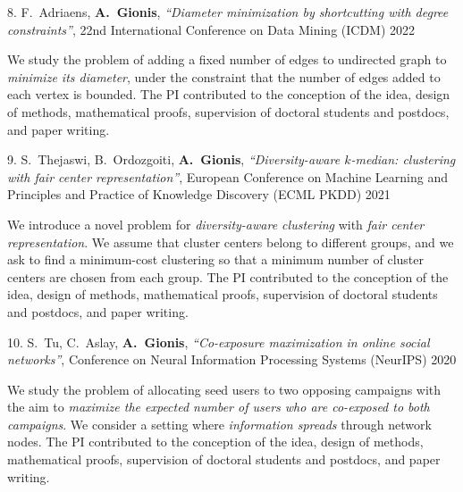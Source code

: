 \documentclass[a4paper,11pt]{article}
\begin{document}
\item[{8.}]
{F.\ Adriaens, \textbf{A.\ Gionis}},
{\em ``Diameter minimization by shortcutting with degree constraints''},
22nd International Conference on Data Mining (ICDM) 2022
%
\item[]
We study the problem of adding a fixed number
of edges to undirected graph to \emph{minimize its diameter}, 
under the constraint that the number of edges added to each vertex is bounded.
The PI contributed to the conception of the idea, 
design of methods, mathematical proofs, supervision of doctoral students and postdocs, and paper writing.

\textbibspace

\item[{9.}]
{S.\ Thejaswi, B.\ Ordozgoiti, \textbf{A.\ Gionis}},
{\em ``Diversity-aware $k$-median: clustering with fair center representation''},
European Conference on Machine Learning and Principles and Practice of Knowledge Discovery (ECML PKDD) 2021 
%
\item[]
We introduce a novel problem for \emph{diversity-aware clustering}
with \emph{fair center representation}.
We assume that cluster centers belong to different groups, 
and we ask to find a minimum-cost clustering so that 
a minimum number of cluster centers are chosen from each group. 
The PI contributed to the conception of the idea, 
design of methods, mathematical proofs, supervision of doctoral students and postdocs, and paper writing.

\textbibspace

\item[{10.}]
{S.\ Tu, C.\ Aslay, \textbf{A.\ Gionis}},
{\em ``Co-exposure maximization in online social networks''},
Conference on Neural Information Processing Systems (NeurIPS) 2020
%
\item[]
We study the problem of allocating seed users to two opposing campaigns 
with the aim to \emph{maximize the expected number of users who are co-exposed to both campaigns}. 
We consider a setting where \emph{information spreads} through network nodes.
The PI contributed to the conception of the idea, 
design of methods, mathematical proofs, supervision of doctoral students and postdocs, and paper writing.

\biblistnend


\end{document}
